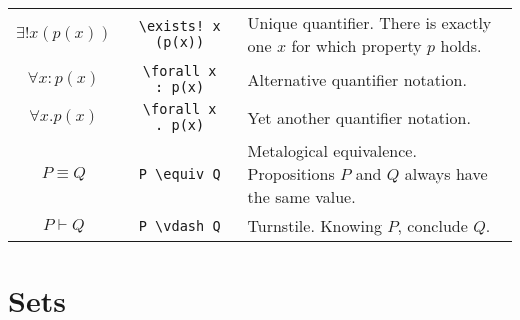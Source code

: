 \documentclass{article}
\begin{document}
\begin{tabularx}{\textwidth}{ccX}
    $\exists! x (p(x))$ & \texttt{{\textbackslash}exists!\ x (p(x))} & Unique quantifier. There is exactly one $x$ for which property $p$ holds. \\
    $\forall x : p(x)$ & \texttt{{\textbackslash}forall x :\ p(x)} & Alternative quantifier notation. \\
    $\forall x . p(x)$ & \texttt{{\textbackslash}forall x .\ p(x)} & Yet another quantifier notation. \\
    $P \equiv Q$ & \texttt{P {\textbackslash}equiv Q} & Metalogical equivalence. Propositions $P$ and $Q$ always have the same value. \\
    $P \vdash Q$ & \texttt{P {\textbackslash}vdash Q} & Turnstile. Knowing $P$, conclude $Q$.
\end{tabularx}


\section{Sets}
\end{document}
